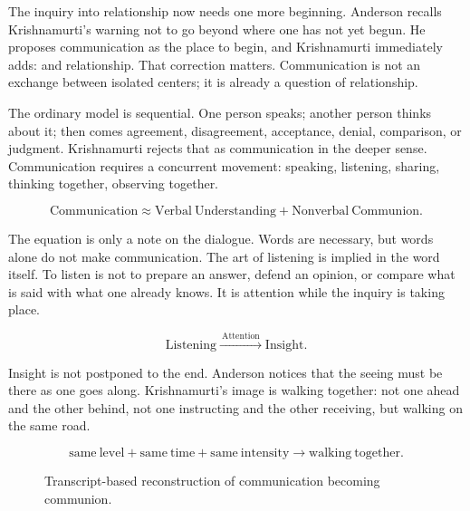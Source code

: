 \documentclass[11pt,oneside]{book}
\begin{document}
The inquiry into relationship now needs one more beginning. Anderson recalls Krishnamurti's warning not to go beyond where one has not yet begun. He proposes communication as the place to begin, and Krishnamurti immediately adds: and relationship. That correction matters. Communication is not an exchange between isolated centers; it is already a question of relationship.

The ordinary model is sequential. One person speaks; another person thinks about it; then comes agreement, disagreement, acceptance, denial, comparison, or judgment. Krishnamurti rejects that as communication in the deeper sense. Communication requires a concurrent movement: speaking, listening, sharing, thinking together, observing together.

\begin{equation}
\mathrm{Communication}
\approx
\mathrm{Verbal\ Understanding}
+
\mathrm{Nonverbal\ Communion}.
\end{equation}

The equation is only a note on the dialogue. Words are necessary, but words alone do not make communication. The art of listening is implied in the word itself. To listen is not to prepare an answer, defend an opinion, or compare what is said with what one already knows. It is attention while the inquiry is taking place.

\begin{equation}
\mathrm{Listening}
\xrightarrow{\ \mathrm{Attention}\ }
\mathrm{Insight}.
\end{equation}

Insight is not postponed to the end. Anderson notices that the seeing must be there as one goes along. Krishnamurti's image is walking together: not one ahead and the other behind, not one instructing and the other receiving, but walking on the same road.

\begin{equation}
\mathrm{same\ level}
+
\mathrm{same\ time}
+
\mathrm{same\ intensity}
\longrightarrow
\mathrm{walking\ together}.
\end{equation}

\begin{figure}
\centering
{}

Transcript-based reconstruction of communication becoming communion.
\end{figure}
\end{document}
